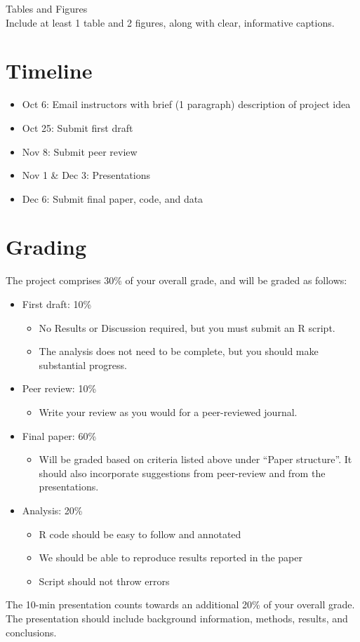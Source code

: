 \documentclass[12pt]{article}
\begin{document}
Tables and Figures \\
Include at least 1 table and 2 figures, along with
clear, informative captions. 


\section*{Timeline}

\begin{itemize}
  \item Oct 6: Email instructors with brief (1 paragraph) description
    of project idea
  \item Oct 25: Submit first draft
  \item Nov 8: Submit peer review
  \item Nov 1 \& Dec 3: Presentations
  \item Dec 6: Submit final paper, code, and data
\end{itemize}


\section*{Grading}

The project comprises 30\% of your overall grade, and will be graded as follows:

\begin{itemize}
  \item First draft: 10\%
    \begin{itemize}
      \item No Results or Discussion required, but you must submit an R script.
      \item The analysis does not need to be complete, but you should make substantial progress.
    \end{itemize}
  \item Peer review: 10\%
    \begin{itemize}
      \item Write your review as you would for a peer-reviewed journal.
    \end{itemize}
  \item Final paper: 60\%
    \begin{itemize}
      \item Will be graded based on criteria listed above under
        ``Paper structure''. It should also incorporate suggestions from
        peer-review and from the presentations.
    \end{itemize}
  \item Analysis: 20\%
    \begin{itemize}
      \item R code should be easy to follow and annotated
      \item We should be able to reproduce results reported in the paper
      \item Script should not throw errors
    \end{itemize}
\end{itemize}

The 10-min presentation counts towards an additional 20\% of your
overall grade. The presentation should include background information,
methods, results, and conclusions.   
\end{document}
